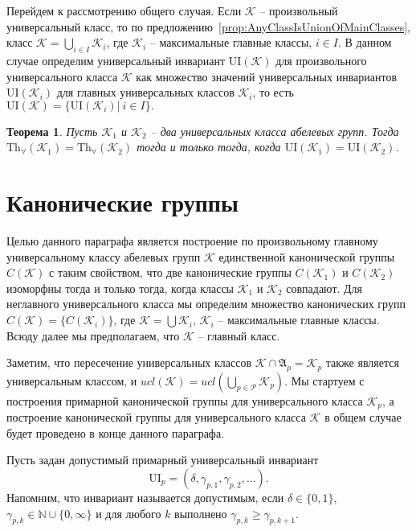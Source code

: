 \documentclass[a4paper,11pt,twoside]{article}
\newtheorem{theorem}{Теорема}[section]
\def\A{{\mathfrak{A}}}
\def\K{{\mathcal{K}}}
\def\P{{\mathcal{P}}}
\def\N{{\mathbb{N}}}
\def\Tha{{\mathrm{Th}_\forall}}
\def\ui{{\mathrm{UI}}}
\begin{document}
Перейдем к рассмотрению общего случая. Если $\K$ -- произвольный универсальный класс, то по предложению~\ref{prop:AnyClassIsUnionOfMainClasses}, класс $\K = \bigcup\limits_{i \in I} \K_i$, где $\K_i$ -- максимальные главные классы, $i \in I$. В данном случае определим универсальный инвариант $\ui(\K)$ для произвольного универсального класса $\K$ как множество значений универсальных инвариантов $\ui(\K_i)$ для главных универсальных классов $\K_i$, то есть $\ui(\K) = \{\ui(\K_i) | \ i \in I\}.$

\begin{theorem}\label{th:UnivEquivAnyClasses}
Пусть $\K_1$ и $\K_2$ -- два универсальных класса абелевых групп. Тогда $\Tha(\K_1) = \Tha(\K_2)$ тогда и только тогда, когда $\ui(\K_1) = \ui(\K_2)$.
\end{theorem}



\section{Канонические группы}\label{sec:CannonicalGroups}

Целью данного параграфа является построение по произвольному главному универсальному классу абелевых групп $\K$ единственной канонической группы $C(\K)$ с таким свойством, что две канонические группы $C(\K_1)$ и $C(\K_2)$ изоморфны тогда и только тогда, когда классы $\K_1$ и $\K_2$ совпадают. Для неглавного универсального класса мы определим множество канонических групп $C(\K) = \{C(\K_i)\}$, где $\K = \bigcup \K_i$, $\K_i$ -- максимальные главные классы. Всюду далее мы предполагаем, что $\K$ -- главный класс. 

Заметим, что пересечение универсальных классов $\K \cap \A_p = \K_p$ также является универсальным классом, и $ucl(\K) = ucl(\bigcup\limits_{p \in \P} \K_p)$. Мы стартуем с построения примарной канонической группы для универсального класса $\K_p$, а построение канонической группы для универсального класса $\K$ в общем случае будет проведено в конце данного параграфа.

Пусть задан допустимый примарный универсальный инвариант 
$$\ui_p = (\delta, \gamma_{p,1}, \gamma_{p,2}, \ldots).$$
Напомним, что инвариант называется допустимым, если $\delta \in \{0,1\}$, $\gamma_{p,k} \in \N \cup \{0, \infty\}$ и для любого $k$ выполнено $\gamma_{p,k} \geq \gamma_{p, k+1}$.
\end{document}
